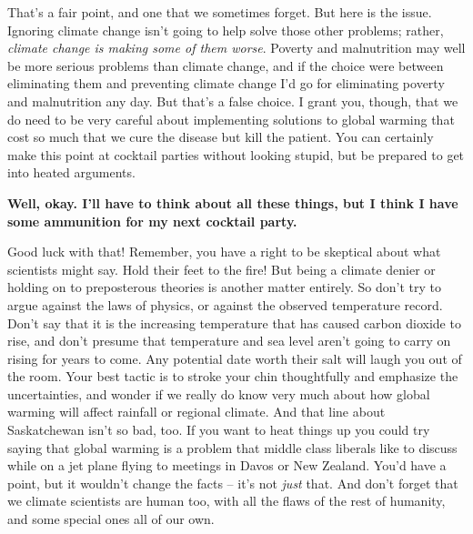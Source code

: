 \documentclass[11pt]{article}
\begin{document}
That's a fair point, and one that we sometimes forget. But here is the
issue. Ignoring climate change isn't going to help solve those other
problems; rather, \emph{climate change is making some of them worse}.
Poverty and malnutrition may well be more serious problems than climate
change, and if the choice were between eliminating them and preventing
climate change I'd go for eliminating poverty and malnutrition any day.
But that's a false choice. I grant you, though, that we do need to be
very careful about implementing solutions to global warming that cost so
much that we cure the disease but kill the patient. You can certainly
make this point at cocktail parties without looking stupid, but be
prepared to get into heated arguments.

\textbf{\color{navy} Well, okay. I'll have to think about all these things, but I
think I have some ammunition for my next cocktail party.}

Good luck with that! Remember, you have a right to be skeptical about what scientists might say. Hold their feet to the fire! But being a climate denier or holding on to preposterous theories is another matter entirely. So don't try to argue against the laws of physics, or against the observed temperature record. Don't say that it is the increasing temperature that has caused carbon dioxide to rise, and don't presume that temperature and sea level aren't going to carry on rising for years to come. Any potential date worth their salt will laugh you out of the room. Your best tactic is to stroke your chin thoughtfully and emphasize the
uncertainties, and wonder if we really do know very much about how
global warming will affect rainfall or regional climate. And that line
about Saskatchewan isn't so bad, too. If you want to heat things up you
could try saying that global warming is a problem that middle class liberals like to discuss
while on a jet plane flying to meetings in Davos or New Zealand. You'd have
a point, but it wouldn't change the facts -- it's not \textit{just} that. And don't forget that we climate scientists
are human too, with all the flaws of the rest of humanity, and some
special ones all of our own.
\end{document}

